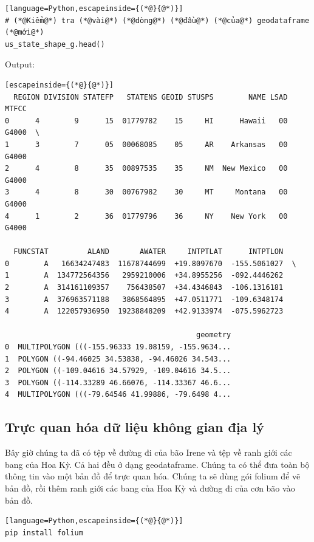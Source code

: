 \begin{lstlisting}[language=Python,escapeinside={(*@}{@*)}]
# (*@Kiểm@*) tra (*@vài@*) (*@dòng@*) (*@đầu@*) (*@của@*) geodataframe (*@mới@*)
us_state_shape_g.head()
\end{lstlisting}

Output:

\begin{lstlisting}[escapeinside={(*@}{@*)}]
  REGION DIVISION STATEFP   STATENS GEOID STUSPS        NAME LSAD  MTFCC   
0      4        9      15  01779782    15     HI      Hawaii   00  G4000  \
1      3        7      05  00068085    05     AR    Arkansas   00  G4000   
2      4        8      35  00897535    35     NM  New Mexico   00  G4000   
3      4        8      30  00767982    30     MT     Montana   00  G4000   
4      1        2      36  01779796    36     NY    New York   00  G4000   

  FUNCSTAT         ALAND       AWATER     INTPTLAT      INTPTLON   
0        A   16634247483  11678744699  +19.8097670  -155.5061027  \
1        A  134772564356   2959210006  +34.8955256  -092.4446262   
2        A  314161109357    756438507  +34.4346843  -106.1316181   
3        A  376963571188   3868564895  +47.0511771  -109.6348174   
4        A  122057936950  19238848209  +42.9133974  -075.5962723   

                                            geometry  
0  MULTIPOLYGON (((-155.96333 19.08159, -155.9634...  
1  POLYGON ((-94.46025 34.53838, -94.46026 34.543...  
2  POLYGON ((-109.04616 34.57929, -109.04616 34.5...  
3  POLYGON ((-114.33289 46.66076, -114.33367 46.6...  
4  MULTIPOLYGON (((-79.64546 41.99886, -79.6498 4...
\end{lstlisting}

\subsection{Trực quan hóa dữ liệu không gian địa lý}

Bây giờ chúng ta đã có tệp về đường đi của bão Irene và tệp về ranh giới các bang của Hoa Kỳ. Cả hai đều ở dạng geodataframe. Chúng ta có thể đưa toàn bộ thông tin vào một bản đồ để trực quan hóa. Chúng ta sẽ dùng gói folium để vẽ bản đồ, rồi thêm ranh giới các bang của Hoa Kỳ và đường đi của cơn bão vào bản đồ.

\begin{lstlisting}[language=Python,escapeinside={(*@}{@*)}]
pip install folium
\end{lstlisting}

